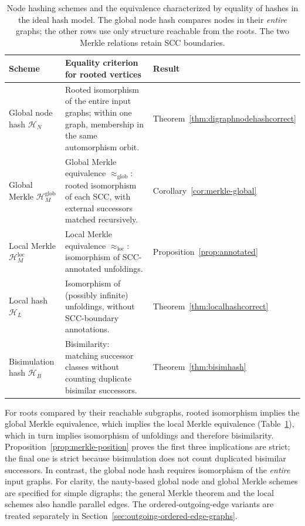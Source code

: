 \documentclass[twoside,leqno]{article}
\newcommand{\HN}{\mathcal{H}_{N}}
\newcommand{\HL}{\mathcal{H}_{L}}
\newcommand{\HB}{\mathcal{H}_{B}}
\newcommand{\HMg}{\mathcal{H}_{M}^{\mathrm{glob}}}
\newcommand{\HMl}{\mathcal{H}_{M}^{\mathrm{loc}}}
\newcommand{\eqg}{\approx_{\mathrm{glob}}}
\newcommand{\eql}{\approx_{\mathrm{loc}}}
\begin{document}
\begin{table}[t]
\centering
\small
\caption{Node hashing schemes and the equivalence characterized by equality of hashes in the ideal hash model. The global node hash compares nodes in their \emph{entire} graphs; the other rows use only structure reachable from the roots. The two Merkle relations retain SCC boundaries.}
\label{tab:equivalences}
\begin{tabular}{@{}p{}p{}p{}@{}}
\toprule
Scheme & Equality criterion for rooted vertices & Result \\
\midrule
Global node hash $\HN$ & Rooted isomorphism of the entire input graphs; within one graph, membership in the same automorphism orbit. & Theorem~\ref{thm:digraphnodehashcorrect} \\
Global Merkle $\HMg$ & Global Merkle equivalence $\eqg$: rooted isomorphism of each SCC, with external successors matched recursively. & Corollary~\ref{cor:merkle-global} \\
Local Merkle $\HMl$ & Local Merkle equivalence $\eql$: isomorphism of SCC-annotated unfoldings. & Proposition~\ref{prop:annotated} \\
Local hash $\HL$ & Isomorphism of (possibly infinite) unfoldings, without SCC-boundary annotations. & Theorem~\ref{thm:localhashcorrect} \\
Bisimulation hash $\HB$ & Bisimilarity: matching successor classes without counting duplicate bisimilar successors. & Theorem~\ref{thm:bisimhash} \\
\bottomrule
\end{tabular}
\end{table}

For roots compared by their reachable subgraphs, rooted isomorphism implies the global Merkle equivalence, which implies the local Merkle equivalence (Table~\ref{tab:equivalences}), which in turn implies isomorphism of unfoldings and therefore bisimilarity.
Proposition~\ref{prop:merkle-position} proves the first three implications are strict; the final one is strict because bisimulation does not count duplicated bisimilar successors. In contrast, the global node hash requires isomorphism of the \emph{entire} input graphs. For clarity, the nauty-based global node and global Merkle schemes are specified for simple digraphs; the general Merkle theorem and the local schemes also handle parallel edges. The ordered-outgoing-edge variants are treated separately in Section~\ref{sec:outgoing-ordered-edge-graphs}.
\end{document}
